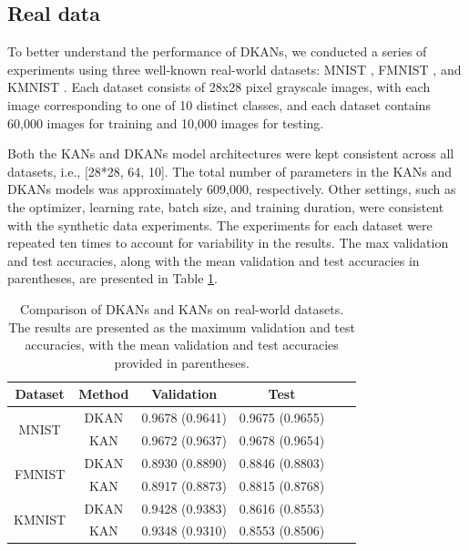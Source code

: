 \documentclass[11pt]{scrartcl}
\begin{document}
\subsection{Real data}

To better understand the performance of DKANs, we conducted a series of experiments using three well-known real-world datasets: MNIST \citep{lecun2010mnist}, FMNIST \citep{xiao2017fashion}, and KMNIST \citep{clanuwat2018deep}. Each dataset consists of 28x28 pixel grayscale images, with each image corresponding to one of 10 distinct classes, and each dataset contains 60,000 images for training and 10,000 images for testing.

Both the KANs and DKANs model architectures were kept consistent across all datasets, i.e., [28*28, 64, 10]. The total number of parameters in the KANs and DKANs models was approximately 609,000, respectively. Other settings, such as the optimizer, learning rate, batch size, and training duration, were consistent with the synthetic data experiments.
The experiments for each dataset were repeated ten times to account for variability in the results. The max validation and test accuracies, along with the mean validation and test accuracies in parentheses, are presented in Table \ref{tab:real-datasets}.

\begin{table}[htbp]
	\centering
	\caption{Comparison of DKANs and KANs on real-world datasets. The results are presented as the maximum validation and test accuracies, with the mean validation and test accuracies provided in parentheses.}
	\label{tab:real-datasets}
	\begin{tabular}{cccccc}
		\toprule
		Dataset                 & Method & Validation      & Test            \\
		\midrule
		\multirow{2}{*}{MNIST}  & DKAN   & 0.9678 (0.9641) & 0.9675 (0.9655) \\
		                        & KAN    & 0.9672 (0.9637) & 0.9678 (0.9654) \\
		\midrule
		\multirow{2}{*}{FMNIST} & DKAN   & 0.8930 (0.8890) & 0.8846 (0.8803) \\
		                        & KAN    & 0.8917 (0.8873) & 0.8815 (0.8768) \\
		\midrule
		\multirow{2}{*}{KMNIST} & DKAN   & 0.9428 (0.9383) & 0.8616 (0.8553) \\
		                        & KAN    & 0.9348 (0.9310) & 0.8553 (0.8506) \\
		\bottomrule
	\end{tabular}
\end{table}
\end{document}
